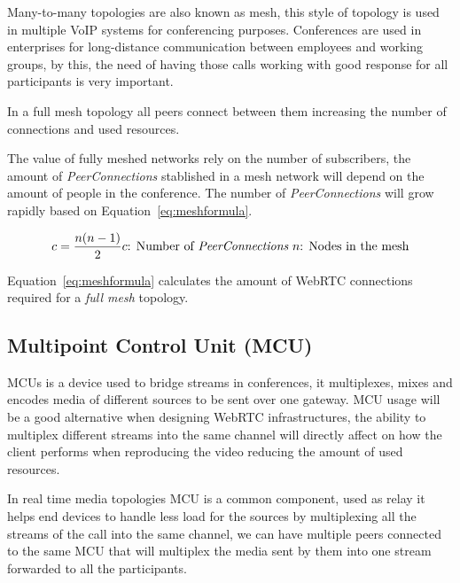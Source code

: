 Many-to-many topologies are also known as mesh, this style of topology is used in multiple VoIP systems for conferencing purposes. Conferences are used in enterprises for long-distance communication between employees and working groups, by this, the need of having those calls working with good response for all participants is very important.

In a full mesh topology all peers connect between them increasing the number of connections and used resources.

The value of fully meshed networks rely on the number of subscribers, the amount of {\it PeerConnections} stablished in a mesh network will depend on the amount of people in the conference. The number of {\it PeerConnections} will grow rapidly based on Equation~\ref{eq:meshformula}.

\begin{equation}
	\label{eq:meshformula}
	c = \frac{n(n-1)}{2}\\
	
	c \text{: Number of {\it PeerConnections}}\
		
	n \text{: Nodes in the mesh}
\end{equation}

Equation~\ref{eq:meshformula} calculates the amount of WebRTC connections required for a {\it full mesh} topology. 


\subsection{Multipoint Control Unit (MCU) }

MCUs is a device used to bridge streams in conferences, it multiplexes, mixes and encodes media of different sources to be sent over one gateway. MCU usage will be a good alternative when designing WebRTC infrastructures, the ability to multiplex different streams into the same channel will directly affect on how the client performs when reproducing the video reducing the amount of used resources. 

In real time media topologies MCU is a common component, used as relay it helps end devices to handle less load for the sources by multiplexing all the streams of the call into the same channel, we can have multiple peers connected to the same MCU that will multiplex the media sent by them into one stream forwarded to all the participants.

